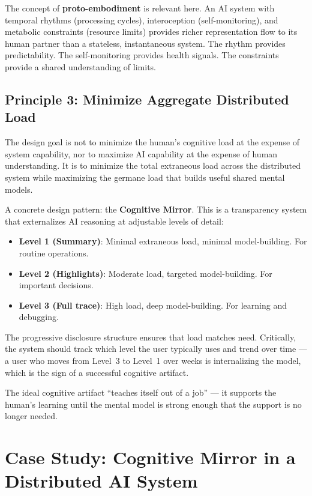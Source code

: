 \documentclass[11pt,a4paper]{article}
\begin{document}
The concept of \textbf{proto-embodiment} is relevant here. An AI system with temporal rhythms (processing cycles), interoception (self-monitoring), and metabolic constraints (resource limits) provides richer representation flow to its human partner than a stateless, instantaneous system. The rhythm provides predictability. The self-monitoring provides health signals. The constraints provide a shared understanding of limits.

\subsection{Principle 3: Minimize Aggregate Distributed Load}

The design goal is not to minimize the human's cognitive load at the expense of system capability, nor to maximize AI capability at the expense of human understanding. It is to minimize the total extraneous load across the distributed system while maximizing the germane load that builds useful shared mental models.

A concrete design pattern: the \textbf{Cognitive Mirror}. This is a transparency system that externalizes AI reasoning at adjustable levels of detail:
\begin{itemize}[leftmargin=*, itemsep=2pt]
  \item \textbf{Level 1 (Summary)}: Minimal extraneous load, minimal model-building. For routine operations.
  \item \textbf{Level 2 (Highlights)}: Moderate load, targeted model-building. For important decisions.
  \item \textbf{Level 3 (Full trace)}: High load, deep model-building. For learning and debugging.
\end{itemize}

The progressive disclosure structure ensures that load matches need. Critically, the system should track which level the user typically uses and trend over time --- a user who moves from Level~3 to Level~1 over weeks is internalizing the model, which is the sign of a successful cognitive artifact.

The ideal cognitive artifact ``teaches itself out of a job'' --- it supports the human's learning until the mental model is strong enough that the support is no longer needed.

\section{Case Study: Cognitive Mirror in a Distributed AI System}
\end{document}
